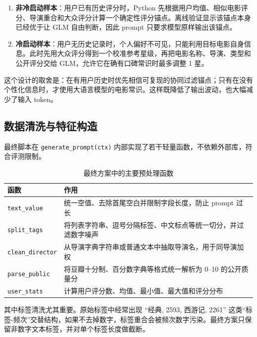 \documentclass[UTF8,a4paper,10pt,fontset=none]{ctexart}
\begin{document}
\begin{enumerate}
    \item \textbf{非冷启动样本}：用户已有历史评分时，Python 先根据用户均值、相似电影评分、导演重合和大众评分计算一个确定性评分锚点。离线验证显示该锚点本身已经优于让 GLM 自由判断，因此 prompt 只要求模型原样输出该锚点。
    \item \textbf{冷启动样本}：用户无历史记录时，个人偏好不可见，只能利用目标电影自身信息。此时先用大众评分得到一个校准参考星级，再把电影名称、导演、类型和公开评分交给 GLM，允许它在确有口碑常识时最多调整 1 星。
\end{enumerate}

这个设计的取舍是：在有用户历史时优先相信可复现的协同过滤锚点；只有在没有个性化信息时，才使用大语言模型的电影常识。这样既降低了输出波动，也大幅减少了输入 token。

\subsection{数据清洗与特征构造}

最终脚本在 \texttt{generate\_prompt(ctx)} 内部实现了若干轻量函数，不依赖外部库，符合评测限制。

\begin{table}[htbp]
    \centering
    \setlength{\tabcolsep}{8pt}
    \caption{最终方案中的主要预处理函数}
    \label{tab:functions}
    \small
    \begin{tabular}{@{}p{}p{}@{}}
        \toprule
        \textbf{函数} & \textbf{作用} \\
        \midrule
        \texttt{text\_value} & 统一空值、去除首尾空白并限制字段长度，防止 prompt 过长 \\
        \texttt{split\_tags} & 将列表字符串、逗号分隔标签、中文标点等统一切分，并过滤数字噪声 \\
        \texttt{clean\_director} & 从导演字典字符串或普通文本中抽取导演名，用于同导演加权 \\
        \texttt{parse\_public} & 将豆瓣十分制、百分数字典等格式统一解析为 0--10 的公开质量分 \\
        \texttt{user\_stats} & 计算用户评分数、均值、最小值、最大值和评分分布 \\
        \bottomrule
    \end{tabular}
\end{table}

其中标签清洗尤其重要。原始标签中经常出现 ``经典, 2593, 西游记, 2261'' 这类``标签-频次''交替结构，如果不去掉数字，标签重合会被频次数字污染。最终方案只保留非数字文本标签，并对单个标签长度做截断。
\end{document}
